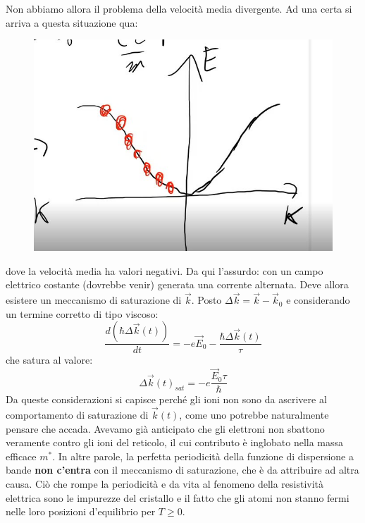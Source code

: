\documentclass{book}
\begin{document}
                        Non abbiamo allora il problema della velocità media divergente. 
                        Ad una certa si arriva a questa situazione qua:
                        \begin{figure}[h!]
                            \centering
                            \includegraphics[width=0.5\linewidth]{img/plot4lez21.png}
                        \end{figure}
                        dove la velocità media ha valori negativi. Da qui l'assurdo: con un campo elettrico costante (dovrebbe venir) generata una corrente alternata. Deve allora esistere un meccanismo di saturazione di $\vec{k}$. Posto $\Delta \vec{k} = \vec{k} - \vec{k}_{0}$ e considerando un termine corretto di tipo viscoso:
                        $$\frac{d (\hbar \Delta \vec{k}(t))}{dt} = -e \vec{E}_{0} - \frac{\hbar \Delta \vec{k}(t)}{\tau}$$
                        che satura al valore:
                        $$\Delta \vec{k}(t)_{sat} = -e\frac{\vec{E}_{0}\tau}{\hbar} $$
                        Da queste considerazioni si capisce perché gli ioni non sono da ascrivere al comportamento di saturazione di $\vec{k}(t)$, come uno potrebbe naturalmente pensare che accada. Avevamo già anticipato che gli elettroni non sbattono veramente contro gli ioni del reticolo, il cui contributo è inglobato nella massa efficace $m^{*}$. In altre parole, la perfetta periodicità della funzione di dispersione a bande \textbf{non c'entra} con il meccanismo di saturazione, che è da attribuire ad altra causa.
                        Ciò che rompe la periodicità e da vita al fenomeno della resistività elettrica sono le impurezze del cristallo e il fatto che gli atomi non stanno fermi nelle loro posizioni d'equilibrio per $T \geq 0$.
\end{document}
